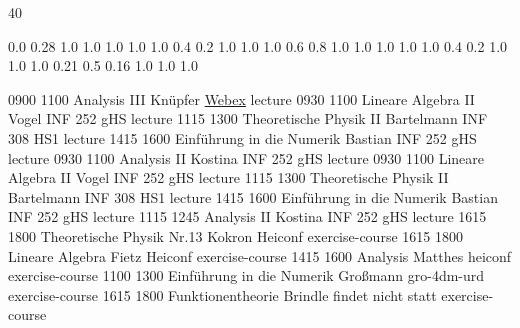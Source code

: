 \documentclass[a4paper,10pt]{report}
\begin{document}
\thispagestyle{empty}
\noindent{}

\setslotsize{2.8cm}{0.3cm}
 {40}
\settextframe{0.8mm}

\seteventcornerradius{0pt}


			{0.0} 	{0.28}	{1.0} 	{1.0}	{1.0}	{1.0}
 	{1.0} 	{0.4} 	{0.2} 	{1.0}	{1.0}	{1.0}
   		{0.6} 	{0.8} 	{1.0} 	{1.0}	{1.0}	{1.0}
 		{1.0} 	{0.4} 	{0.2} 	{1.0}	{1.0}	{1.0}
       		{0.21}	{0.5} 	{0.16}	{1.0}	{1.0}	{1.0}

\begin{timetable}
   {0900} {1100} {Analysis III}                   {Knüpfer}       {\href{https://globalpage-prod.webex.com/signin?surl=https%3A%2F%2Fsignin.webex.com%2Fcollabs%2Fauth%3F}{Webex}} {lecture}
   {0930} {1100} {Lineare Algebra II}             {Vogel}      	  {INF 252 gHS} 		{lecture}
   {1115} {1300} {Theoretische Physik II}         {Bartelmann}    {INF 308 HS1}     {lecture}
   {1415} {1600} {Einführung in die Numerik}      {Bastian}      	{INF 252 gHS}    	{lecture}
   {0930} {1100} {Analysis II}     							  {Kostina}     	{INF 252 gHS}     {lecture}
   {0930} {1100} {Lineare Algebra II}             {Vogel}         {INF 252 gHS} 		{lecture}
   {1115} {1300} {Theoretische Physik II} 		    {Bartelmann}   	{INF 308 HS1}    	{lecture}
   {1415} {1600} {Einführung in die Numerik}      {Bastian}       {INF 252 gHS}    	{lecture}
   {1115} {1245} {Analysis II}      		   				{Kostina}       {INF 252 gHS}    	{lecture}
   {1615} {1800} {Theoretische Physik}						{Nr.13 Kokron}	{Heiconf}	{exercise-course}
   {1615} {1800} {Lineare Algebra}							{Fietz}		{Heiconf}	{exercise-course}
   {1415} {1600} {Analysis}									{Matthes}		{heiconf}	{exercise-course}
   {1100} {1300} {Einführung in die Numerik}	{Großmann}		{gro-4dm-urd}	{exercise-course} 
   {1615} {1800} {Funktionentheorie}          {Brindle} {findet nicht statt} {exercise-course}
\end{timetable}
\end{document}
